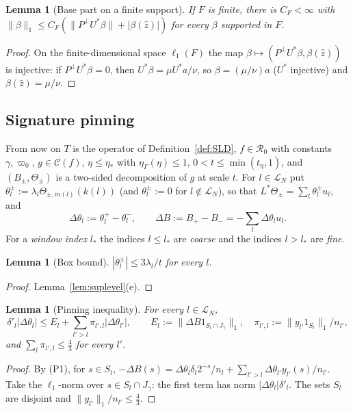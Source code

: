 \documentclass[10pt]{amsart}
\newtheorem{lemma}[theorem]{Lemma}
\theoremstyle{definition}
\theoremstyle{remark}
\newcommand{\Cset}{\mathcal C}
\newcommand{\zh}{\hat z}
\begin{document}
\begin{lemma}[Base part on a finite support]\label{lem:finitebase}
If $F$ is finite, there is $C_F<\infty$ with $\|\beta\|_1\le C_F(\|P^\perp
U^*\beta\|+|\beta(\zh)|)$ for every $\beta$ supported in $F$.
\end{lemma}

\begin{proof}
On the finite-dimensional space $\ell_1(F)$ the map $\beta\mapsto
(P^\perp U^*\beta,\beta(\zh))$ is injective: if $P^\perp U^*\beta=0$, then
$U^*\beta=\mu U^*a/\nu$, so $\beta=(\mu/\nu)a$ ($U^*$ injective) and
$\beta(\zh)=\mu/\nu$.
\end{proof}

\subsection{Signature pinning}
From now on $T$ is the operator of Definition~\ref{def:SLD}, $f\in
\mathcal R_0$ with constants $\gamma,\varpi_0$, $g\in\Cset(f)$,
$\eta\le\eta_*$ with $\eta_\Gamma(\eta)\le1$, $0<t\le\min(t_\eta,1)$, and
$(B_\pm,\Theta_\pm)$ is a two-sided decomposition of $g$ at scale $t$.  For
$l\in\mathcal L_N$ put $\theta^\pm_l:=\lambda_l\Theta_{\pm,m(l)}(k(l))$ (and
$\theta^\pm_l:=0$ for $l\notin\mathcal L_N$), so that $L^*\Theta_\pm=
\sum_l\theta^\pm_lu_l$, and
\[
 \Delta\theta_l:=\theta^+_l-\theta^-_l,\qquad \Delta B:=B_+-B_-=-\sum_l\Delta\theta_lu_l .
\]
For a \emph{window index} $l_*$ the indices $l\le l_*$ are \emph{coarse}
and the indices $l>l_*$ are \emph{fine}.

\begin{lemma}[Box bound]\label{lem:box}
$|\theta^\pm_l|\le3\lambda_l/t$ for every $l$.
\end{lemma}

\begin{proof}
Lemma~\ref{lem:suplevel}(e).
\end{proof}

\begin{lemma}[Pinning inequality]\label{lem:pinning}
For every $l\in\mathcal L_N$,
\[
 \delta'_l|\Delta\theta_l|\le E_l+\sum_{l'>l}\pi_{l',l}|\Delta\theta_{l'}|,\qquad
 E_l:=\|\Delta B1_{S_l\cap J_\gamma}\|_1,\quad\pi_{l',l}:=
 \|y_{l'}1_{S_l}\|_1/n_{l'},
\]
and $\sum_l\pi_{l',l}\le\frac43$ for every $l'$.
\end{lemma}

\begin{proof}
By (P1), for $s\in S_l$,
$-\Delta B(s)=\Delta\theta_l\delta_l2^{-s}/n_l+\sum_{l'>l}\Delta\theta_{l'}y_{l'}(s)/
n_{l'}$.  Take the $\ell_1$-norm over $s\in S_l\cap J_\gamma$: the first term
has norm $|\Delta\theta_l|\delta'_l$.  The sets $S_l$ are disjoint and
$\|y_{l'}\|_1/n_{l'}\le\frac43$.
\end{proof}
\end{document}
